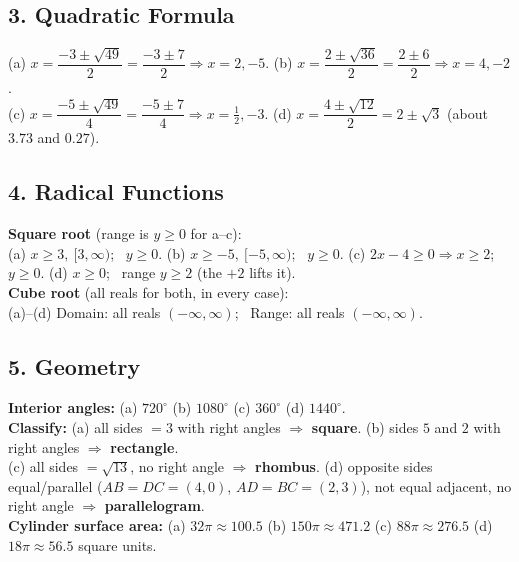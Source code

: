 \documentclass[11pt]{article}
\begin{document}
\subsection*{3. Quadratic Formula}
(a) $x=\dfrac{-3\pm\sqrt{49}}{2}=\dfrac{-3\pm7}{2}\Rightarrow x=2,-5$. \quad
(b) $x=\dfrac{2\pm\sqrt{36}}{2}=\dfrac{2\pm6}{2}\Rightarrow x=4,-2$. \\
(c) $x=\dfrac{-5\pm\sqrt{49}}{4}=\dfrac{-5\pm7}{4}\Rightarrow x=\tfrac12,-3$. \quad
(d) $x=\dfrac{4\pm\sqrt{12}}{2}=2\pm\sqrt3$ (about $3.73$ and $0.27$).

\subsection*{4. Radical Functions}
\textbf{Square root} (range is $y\ge 0$ for a--c): \\
(a) $x\ge 3,\ [3,\infty)$; \ $y\ge 0$. \quad (b) $x\ge -5,\ [-5,\infty)$; \ $y\ge 0$. \quad
(c) $2x-4\ge0\Rightarrow x\ge 2$; \ $y\ge 0$. \quad (d) $x\ge 0$; \ range $y\ge 2$ (the $+2$ lifts it). \\
\textbf{Cube root} (all reals for both, in every case): \\
(a)--(d) Domain: all reals $(-\infty,\infty)$; \ Range: all reals $(-\infty,\infty)$.

\subsection*{5. Geometry}
\textbf{Interior angles:} (a) $720^\circ$ \quad (b) $1080^\circ$ \quad (c) $360^\circ$ \quad (d) $1440^\circ$. \\
\textbf{Classify:} (a) all sides $=3$ with right angles $\Rightarrow$ \textbf{square}. \quad
(b) sides $5$ and $2$ with right angles $\Rightarrow$ \textbf{rectangle}. \\
(c) all sides $=\sqrt{13}$, no right angle $\Rightarrow$ \textbf{rhombus}. \quad
(d) opposite sides equal/parallel ($AB=DC=(4,0)$, $AD=BC=(2,3)$), not equal adjacent, no right angle $\Rightarrow$ \textbf{parallelogram}. \\
\textbf{Cylinder surface area:} (a) $32\pi\approx100.5$ \quad (b) $150\pi\approx471.2$ \quad
(c) $88\pi\approx276.5$ \quad (d) $18\pi\approx56.5$ square units.
\end{document}
